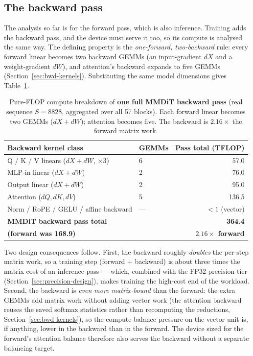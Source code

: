 \documentclass[11pt]{report}
\begin{document}
\subsection{The backward pass}
\label{sec:compute-backward}

The analysis so far is for the forward pass, which is also inference. Training
adds the backward pass, and the device must serve it too, so its compute is
analysed the same way. The defining property is the \emph{one-forward,
two-backward} rule: every forward linear becomes two backward GEMMs (an
input-gradient $dX$ and a weight-gradient $dW$), and attention's backward
expands to five GEMMs (Section~\ref{sec:bwd-kernels}). Substituting the same
model dimensions gives Table~\ref{tab:compute-backward}.

\begin{table}[h]
\centering
\caption{Pure-FLOP compute breakdown of \textbf{one full MMDiT backward pass}
(real sequence $S=8828$, aggregated over all 57 blocks). Each forward linear
becomes two GEMMs ($dX{+}dW$); attention becomes five. The backward is
$2.16\times$ the forward matrix work.}
\label{tab:compute-backward}
\begin{tabular}{@{}llr@{}}
\toprule
Backward kernel class & GEMMs & Pass total (TFLOP) \\
\midrule
Q / K / V linears ($dX{+}dW$, $\times3$) & 6 & 57.0 \\
MLP-in linear ($dX{+}dW$) & 2 & 76.0 \\
Output linear ($dX{+}dW$) & 2 & 95.0 \\
Attention ($dQ,dK,dV$) & 5 & 136.5 \\
Norm / RoPE / GELU / affine backward & --- & $<1$ (vector) \\
\midrule
\textbf{MMDiT backward pass total} & & \textbf{364.4} \\
\textbf{(forward was 168.9)} & & \textbf{$2.16\times$ forward} \\
\bottomrule
\end{tabular}
\end{table}

Two design consequences follow. First, the backward roughly \emph{doubles}
the per-step matrix work, so a training step (forward $+$ backward) is about
three times the matrix cost of an inference pass --- which, combined with the
FP32 precision tier (Section~\ref{sec:precision-design}), makes training the
high-cost end of the workload. Second, the backward is \emph{even more
matrix-bound} than the forward: the extra GEMMs add matrix work without
adding vector work (the attention backward reuses the saved softmax
statistics rather than recomputing the reductions,
Section~\ref{sec:bwd-kernels}), so the compute-balance pressure on the vector
unit is, if anything, lower in the backward than in the forward. The device
sized for the forward's attention balance therefore also serves the backward
without a separate balancing target.
\end{document}
